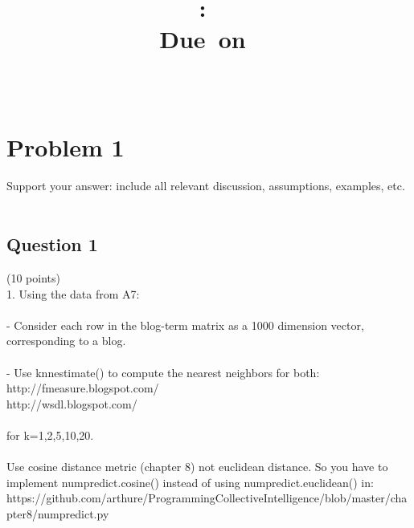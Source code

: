 \documentclass[10pt,letterpaper]{article}
\title{
\vspace{2in}
\textmd{\textbf{\hmwkClass:\ \hmwkTitle}}\\
\normalsize\vspace{0.1in}\small{Due\ on\ \hmwkDueDate}\\
\vspace{0.1in}\large{\textit{\hmwkClassInstructor\ \hmwkClassTime}}
\vspace{3in}
}
\author{\textbf{\hmwkAuthorName}}
\begin{document}
\maketitle


\pagebreak
\tableofcontents
\pagebreak 




\section{Problem 1}
Support your answer: include all relevant discussion, assumptions, examples, etc.\\
\\
\subsection{Question 1}
(10 points)\\
1.  Using the data from A7:\\
\\
- Consider each row in the blog-term matrix as a 1000 dimension vector, corresponding to a blog.\\
\\
- Use knnestimate() to compute the nearest neighbors for both:\\
	http://f\-measure.blogspot.com/\\
	http://ws\-dl.blogspot.com/\\
\\
	for k={1,2,5,10,20}.\\
\\
	Use cosine distance metric (chapter 8) not euclidean distance. 	So you have to implement numpredict.cosine() instead of using 	numpredict.euclidean() in:\\
	https://github.com/arthur\-e/Programming\-Collective\-Intelligence/blob/master/chapter8/numpredict.py\\
\\
\end{document}
